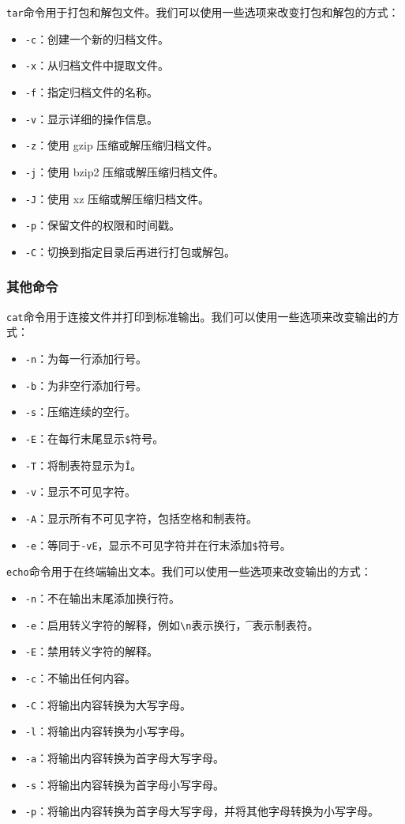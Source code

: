 \documentclass[../main.tex]{subfiles}
\begin{document}
\texttt{tar}命令用于打包和解包文件。我们可以使用一些选项来改变打包和解包的方式：
\begin{itemize}
    \item \texttt{-c}：创建一个新的归档文件。
    \item \texttt{-x}：从归档文件中提取文件。
    \item \texttt{-f}：指定归档文件的名称。
    \item \texttt{-v}：显示详细的操作信息。
    \item \texttt{-z}：使用 gzip 压缩或解压缩归档文件。
    \item \texttt{-j}：使用 bzip2 压缩或解压缩归档文件。
    \item \texttt{-J}：使用 xz 压缩或解压缩归档文件。
    \item \texttt{-p}：保留文件的权限和时间戳。
    \item \texttt{-C}：切换到指定目录后再进行打包或解包。
\end{itemize}

\subsubsection{其他命令}

\texttt{cat}命令用于连接文件并打印到标准输出。我们可以使用一些选项来改变输出的方式：
\begin{itemize}
    \item \texttt{-n}：为每一行添加行号。
    \item \texttt{-b}：为非空行添加行号。
    \item \texttt{-s}：压缩连续的空行。
    \item \texttt{-E}：在每行末尾显示\texttt{\$}符号。
    \item \texttt{-T}：将制表符显示为\texttt{\^I}。
    \item \texttt{-v}：显示不可见字符。
    \item \texttt{-A}：显示所有不可见字符，包括空格和制表符。
    \item \texttt{-e}：等同于\texttt{-vE}，显示不可见字符并在行末添加\texttt{\$}符号。
\end{itemize}

\texttt{echo}命令用于在终端输出文本。我们可以使用一些选项来改变输出的方式：
\begin{itemize}
    \item \texttt{-n}：不在输出末尾添加换行符。
    \item \texttt{-e}：启用转义字符的解释，例如\texttt{\textbackslash n}表示换行，\texttt{\t}表示制表符。
    \item \texttt{-E}：禁用转义字符的解释。
    \item \texttt{-c}：不输出任何内容。
    \item \texttt{-C}：将输出内容转换为大写字母。
    \item \texttt{-l}：将输出内容转换为小写字母。
    \item \texttt{-a}：将输出内容转换为首字母大写字母。
    \item \texttt{-s}：将输出内容转换为首字母小写字母。
    \item \texttt{-p}：将输出内容转换为首字母大写字母，并将其他字母转换为小写字母。
\end{itemize}
\end{document}
